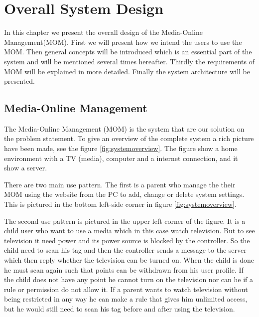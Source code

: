 \chapter{Overall System Design}
In this chapter we present the overall design of the Media-Online Management(MOM). First we will present how we intend the users to use the MOM. Then general concepts will be introduced which is an essential part of the system and will be mentioned several times hereafter. Thirdly the requirements of MOM will be explained in more detailed. Finally the system architecture will be presented.    


\section{Media-Online Management} %
The Media-Online Management (MOM) is the system that are our solution on the problem statement. To give an overview of the complete system a rich picture \citep{OOAD} have been made, see the figure \ref{fig:systemoverview}. The figure show a home environment with a TV (media), computer and a internet connection, and it show a server. 

There are two main use pattern. The first is a parent who manage the their MOM using the website from the PC to add, change or delete system settings. This is pictured in the bottom left-side corner in figure \ref{fig:systemoverview}. 

The second use pattern is pictured in the upper left corner of the figure. It is a child user who want to use a media which in this case watch television. But to see television it need power and its power source is blocked by the controller. So the child need to scan his tag and then the controller sends a message to the server which then reply whether the television can be turned on. When the child is done he must scan again such that points can be withdrawn from his user profile. If the child does not have any point he cannot turn on the television nor can he if a rule or permission do not allow it. If a parent wants to watch television without being restricted in any way he can make a rule that gives him unlimited access, but he would still need to scan his tag before and after using the television.


